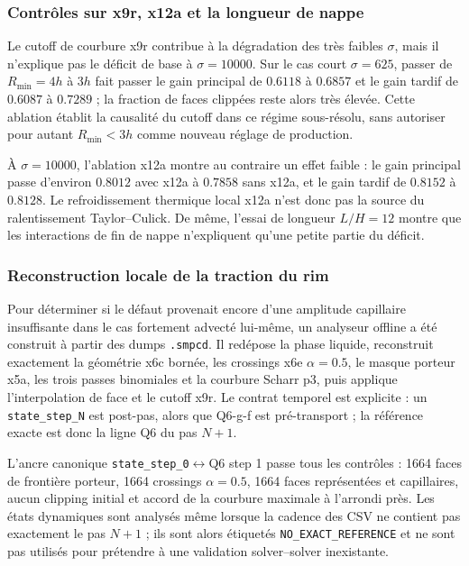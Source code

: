 \documentclass[11pt,a4paper]{article}
\begin{document}
\subsubsection{Contrôles sur x9r, x12a et la longueur de nappe}

Le cutoff de courbure x9r contribue à la dégradation des très faibles $\sigma$, mais il n'explique pas le déficit de base à $\sigma=10000$. Sur le cas court $\sigma=625$, passer de $R_{\min}=4h$ à $3h$ fait passer le gain principal de $0.6118$ à $0.6857$ et le gain tardif de $0.6087$ à $0.7289$ ; la fraction de faces clippées reste alors très élevée. Cette ablation établit la causalité du cutoff dans ce régime sous-résolu, sans autoriser pour autant $R_{\min}<3h$ comme nouveau réglage de production.

À $\sigma=10000$, l'ablation x12a montre au contraire un effet faible : le gain principal passe d'environ $0.8012$ avec x12a à $0.7858$ sans x12a, et le gain tardif de $0.8152$ à $0.8128$. Le refroidissement thermique local x12a n'est donc pas la source du ralentissement Taylor--Culick. De même, l'essai de longueur $L/H=12$ montre que les interactions de fin de nappe n'expliquent qu'une petite partie du déficit.

\subsubsection{Reconstruction locale de la traction du rim}

Pour déterminer si le défaut provenait encore d'une amplitude capillaire insuffisante dans le cas fortement advecté lui-même, un analyseur offline a été construit à partir des dumps \texttt{.smpcd}. Il redépose la phase liquide, reconstruit exactement la géométrie x6c bornée, les crossings x6e $\alpha=0.5$, le masque porteur x5a, les trois passes binomiales et la courbure Scharr p3, puis applique l'interpolation de face et le cutoff x9r. Le contrat temporel est explicite : un \texttt{state\_step\_N} est post-pas, alors que Q6-g-f est pré-transport ; la référence exacte est donc la ligne Q6 du pas $N+1$.

L'ancre canonique \texttt{state\_step\_0}$\leftrightarrow$Q6 step 1 passe tous les contrôles : 1664 faces de frontière porteur, 1664 crossings $\alpha=0.5$, 1664 faces représentées et capillaires, aucun clipping initial et accord de la courbure maximale à l'arrondi près. Les états dynamiques sont analysés même lorsque la cadence des CSV ne contient pas exactement le pas $N+1$ ; ils sont alors étiquetés \texttt{NO\_EXACT\_REFERENCE} et ne sont pas utilisés pour prétendre à une validation solver--solver inexistante.
\end{document}
